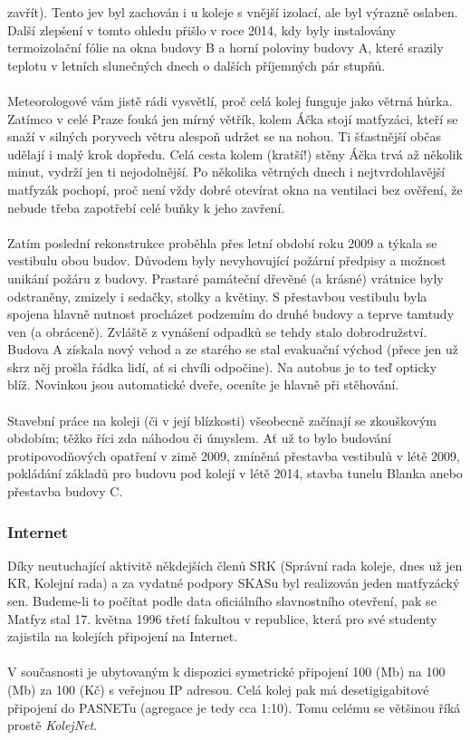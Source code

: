 zavřít). Tento jev byl zachován i u koleje s vnější izolací, ale byl výrazně
oslaben. Další zlepšení v tomto ohledu přišlo v roce 2014, kdy byly instalovány
termoizolační fólie na okna budovy B a horní poloviny budovy A, které srazily
teplotu v letních slunečných dnech o dalších příjemných pár stupňů.
\\\\
Meteorologové vám jistě rádi vysvětlí, proč celá kolej funguje jako větrná
hůrka. Zatímco v celé Praze fouká jen mírný větřík, kolem Áčka stojí matfyzáci,
kteří se snaží v silných poryvech větru alespoň udržet se na nohou. Ti
šťastnější občas udělají i malý krok dopředu. Celá cesta kolem (kratší!) stěny
Áčka trvá až několik minut, vydrží jen ti nejodolnější. Po několika větrných
dnech i nejtvrdohlavější matfyzák pochopí, proč není vždy dobré otevírat okna na
ventilaci bez ověření, že nebude třeba zapotřebí celé buňky k jeho zavření.
\\\\
Zatím poslední rekonstrukce proběhla přes letní období roku 2009 a týkala se
vestibulu obou budov. Důvodem byly nevyhovující požární předpisy a možnost
unikání požáru z budovy. Prastaré památeční dřevěné (a krásné) vrátnice byly
odstraněny, zmizely i sedačky, stolky a květiny. S přestavbou vestibulu byla
spojena hlavně nutnost procházet podzemím do druhé budovy a teprve tamtudy ven
(a obráceně). Zvláště z vynášení odpadků se tehdy stalo dobrodružství. Budova A
získala nový vchod a ze starého se stal evakuační východ (přece jen už skrz něj
prošla řádka lidí, ať si chvíli odpočine). Na autobus je to teď opticky blíž.
Novinkou jsou automatické dveře, oceníte je hlavně při stěhování.
\\\\
Stavební práce na koleji (či v její blízkosti) všeobecně začínají se zkouškovým
obdobím; těžko říci zda náhodou či úmyslem. Ať už to bylo budování
protipovodňových opatření v zimě 2009, zmíněná přestavba vestibulů v létě 2009,
pokládání základů pro budovu pod kolejí v létě 2014, stavba tunelu Blanka anebo
přestavba budovy C.


\subsubsection{Internet}
Díky neutuchající aktivitě někdejších členů SRK (Správní rada koleje, dnes už
jen KR, Kolejní rada) a za vydatné podpory SKASu byl realizován jeden matfyzácký
sen. Budeme-li to počítat podle data oficiálního slavnostního otevření, pak se
Matfyz stal 17. května 1996 třetí fakultou v republice, která pro své studenty
zajistila na kolejích připojení na Internet.
\\\\
V současnosti je ubytovaným k dispozici symetrické připojení 100 (Mb) na 100
(Mb) za 100 (Kč) s veřejnou IP adresou. Celá kolej pak má desetigigabitové
připojení do PASNETu (agregace je tedy cca 1:10). Tomu celému se většinou říká
prostě \textit{KolejNet}.

